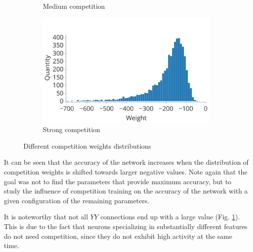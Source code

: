 \documentclass[a4paper]{article}
\begin{document}
\begin{figure}
\begin{subfigure}{0.45\textwidth}
    \caption{Medium competition} 
\end{subfigure}
\begin{subfigure}{0.45\textwidth}
    \includegraphics[width=\textwidth,keepaspectratio=true]{competition_distribution_best.pdf}
    \caption{Strong competition}
    \label{fig:best_competition}
\end{subfigure}
\caption{Different competition weights distributions}
\label{fig:competition_distributions}
\end{figure}

It can be seen that the accuracy of the network increases when the distribution of competition weights is shifted towards larger negative values. Note again that the goal was not to find the parameters that provide maximum accuracy, but to study the influence of competition training on the accuracy of the network with a given configuration of the remaining parameters.

It is noteworthy that not all $ YY $ connections end up with a large value (Fig. \ref{fig:best_competition}). This is due to the fact that neurons specializing in substantially different features do not need competition, since they do not exhibit high activity at the same time.
\end{document}
